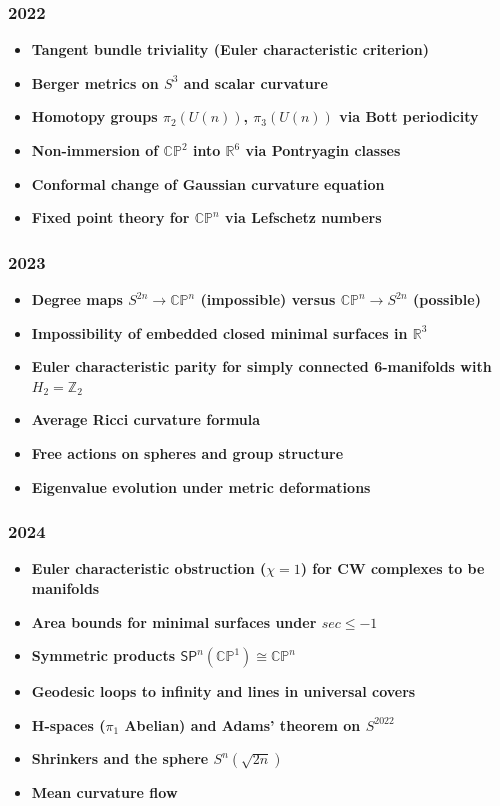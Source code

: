 \subsubsection*{2022}
\begin{itemize}
    \item \textbf{Tangent bundle triviality (Euler characteristic criterion)}
    \item \textbf{Berger metrics on $S^3$ and scalar curvature}
    \item \textbf{Homotopy groups $\pi_2(U(n))$, $\pi_3(U(n))$ via Bott periodicity}
    \item \textbf{Non-immersion of $\mathbb{CP}^2$ into $\mathbb{R}^6$ via Pontryagin classes}
    \item \textbf{Conformal change of Gaussian curvature equation}
    \item \textbf{Fixed point theory for $\mathbb{CP}^n$ via Lefschetz numbers}
\end{itemize}

\subsubsection*{2023}
\begin{itemize}
    \item \textbf{Degree maps $S^{2n} \to \mathbb{CP}^n$ (impossible) versus $\mathbb{CP}^n \to S^{2n}$ (possible)}
    \item \textbf{Impossibility of embedded closed minimal surfaces in $\mathbb{R}^3$}
    \item \textbf{Euler characteristic parity for simply connected 6-manifolds with $H_2 = \mathbb{Z}_2$}
    \item \textbf{Average Ricci curvature formula}
    \item \textbf{Free actions on spheres and group structure}
    \item \textbf{Eigenvalue evolution under metric deformations}
\end{itemize}

\subsubsection*{2024}
\begin{itemize}
    \item \textbf{Euler characteristic obstruction ($\chi = 1$) for CW complexes to be manifolds}
    \item \textbf{Area bounds for minimal surfaces under $sec \leq -1$}
    \item \textbf{Symmetric products $\mathsf{SP}^n(\mathbb{CP}^1) \cong \mathbb{CP}^n$}
    \item \textbf{Geodesic loops to infinity and lines in universal covers}
    \item \textbf{H-spaces ($\pi_1$ Abelian) and Adams' theorem on $S^{2022}$}
    \item \textbf{Shrinkers and the sphere $S^n(\sqrt{2n})$}
    \item \textbf{Mean curvature flow}
\end{itemize}

